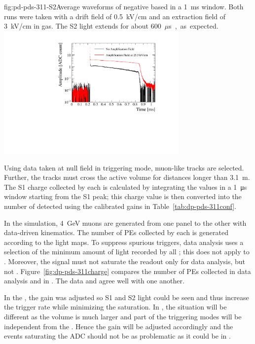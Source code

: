 \begin{dunefigure}{fig:pd-pds-311-S2}{Average waveforms of negative based  in a \SI{1}{ms} window. Both runs were taken with a drift field of \SI{0.5}{kV/cm} and an extraction field of \SI{3}{kV/cm} in gas. The S2 light extends for about \SI{600}{$\mu$s}, as expected.}
\includegraphics[width=0.7\textwidth]{graphics/dppd_311_S2_extraction.pdf}
\end{dunefigure}
Using data taken at null field in  triggering mode, muon-like tracks are selected. Further, the tracks must cross the active volume for distances longer than \SI{3.1}{\m}. 
The S1 charge collected by each  is calculated by integrating the  values in a \SI{1}{\us} window starting from the S1 peak; this charge value is then converted into the number of detected  using the calibrated  gains in Table~\ref{tab:dp-pds-311conf}.

In the simulation, \SI{4}{\GeV} muons are generated from one  panel to the other with data-driven kinematics. The number of PEs collected by each  is generated according to the light maps. To suppress spurious triggers, data analysis uses a selection of the minimum amount of light recorded by all ; this does not apply to . Moreover, the  signal must not saturate the readout only for data analysis, but not . Figure~\ref{fig:dp-pds-311charge} compares the number of PEs collected in data analysis and in . The data and  agree well with one another. 

In the , the  gain was adjusted so S1 and S2 light could be seen and thus increase the trigger rate while minimizing the   saturation. 
In \dune \dual, the situation will be different as the volume is much larger and part of the triggering modes will be independent from the . 
Hence the  gain will be adjusted accordingly and the events saturating the ADC should not be as problematic as it could be in .

